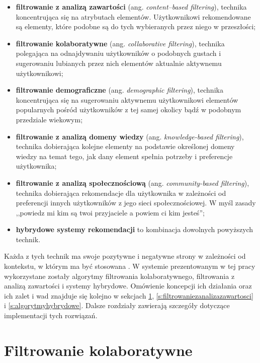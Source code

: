 \documentclass[twoside]{iisthesis}
\begin{document}
	 \begin{itemize}
	 	\item \textbf{filtrowanie z analizą zawartości} (ang. \textit{content--based filtering}), technika koncentrująca się na atrybutach elementów. Użytkownikowi rekomendowane są elementy, które podobne są do tych wybieranych przez niego w przeszłości;
	 	\item \textbf{filtrowanie kolaboratywne} (ang. \textit{collaborative filtering}), technika polegająca na odnajdywaniu użytkowników o podobnych gustach i sugerowaniu lubianych przez nich elementów aktualnie aktywnemu użytkownikowi;
	 	\item \textbf{filtrowanie demograficzne} (ang. \textit{demographic filtering}), technika koncentrująca się na sugerowaniu aktywnemu użytkownikowi elementów popularnych pośród użytkowników z tej samej okolicy bądź w podobnym przedziale wiekowym;
	 	\item \textbf{filtrowanie z analizą domeny wiedzy} (ang. \textit{knowledge-based filtering}), technika dobierająca kolejne elementy na podstawie określonej domeny wiedzy na temat tego, jak dany element spełnia potrzeby i preferencje użytkownika;	
	 	\item \textbf{filtrowanie z analizą społecznościową} (ang. \textit{community-based filtering}), technika dobierająca rekomendacje dla użytkownika w zależności od preferencji innych użytkowników z jego sieci społecznościowej. W myśl zasady ,,powiedz mi kim są twoi przyjaciele a powiem ci kim jesteś'';
	 	\item \textbf{hybrydowe systemy rekomendacji} to kombinacja dowolnych powyższych technik.
	 \end{itemize}
	 
	 Każda z tych technik ma swoje pozytywne i negatywne strony w zależności od kontekstu, w którym ma być stosowana \cite{id:IntroductionToRecommenderSystemsHandbook}. W systemie prezentowanym w tej pracy wykorzystane zostały algorytmy filtrowania kolaboratywnego, filtrowania z analizą zawartości i systemy hybrydowe. Omówienie koncepcji ich działania oraz ich zalet i wad znajduje się kolejno w sekcjach \ref{s:filtrowaniekolaboratywne}, \ref{s:filtrowaniezanalizazawartosci} i \ref{s:algorytmyhybrydowe}. Dalsze rozdziały zawierają szczegóły dotyczące implementacji tych rozwiązań.
	 
	  \section{Filtrowanie kolaboratywne}
	  \label{s:filtrowaniekolaboratywne}
	  
\end{document}
